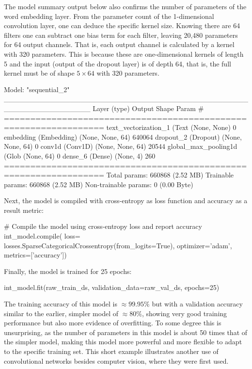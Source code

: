 The model summary output below also confirms the number of parameters of the word embedding layer. From the parameter count of the 1-dimensional convolution layer, one can deduce the specific kernel size. Knowing there are 64 filters one can subtract one bias term for each filter, leaving 20,480 parameters for 64 output channels. That is, each output channel is calculated by a kernel with 320 parameters. This is because these are one-dimensional kernels of length 5 and the input (output of the dropout layer) is of depth 64, that is, the full kernel must be of shape $5 \times 64$ with 320 parameters. 

\begin{textcode}
Model: "sequential_2"
_________________________________________________________________
 Layer (type)                Output Shape              Param #   
=================================================================
 text_vectorization_1 (Text  (None, None)              0         
 embedding (Embedding)       (None, None, 64)          640064    
 dropout_2 (Dropout)         (None, None, 64)          0         
 conv1d (Conv1D)             (None, None, 64)          20544     
 global_max_pooling1d (Glob  (None, 64)                0         
 dense_6 (Dense)             (None, 4)                 260       
=================================================================
Total params: 660868 (2.52 MB)
Trainable params: 660868 (2.52 MB)
Non-trainable params: 0 (0.00 Byte)
\end{textcode}

Next, the model is compiled with cross-entropy as loss function and accuracy as a result metric:

\begin{pythoncode}
# Compile the model using cross-entropy loss and report accuracy
int_model.compile(
    loss= losses.SparseCategoricalCrossentropy(from_logits=True),
    optimizer='adam',
    metrics=['accuracy'])
\end{pythoncode}

Finally, the model is trained for 25 epochs: 

\begin{pythoncode}
int_model.fit(raw_train_ds, 
              validation_data=raw_val_ds, 
              epochs=25)
\end{pythoncode}

The training accuracy of this model is $\approx 99.95\%$ but with a validation accuracy similar to the earlier, simpler model of $\approx 80\%$, showing very good training performance but also more evidence of overfitting. To some degree this is unsurprising, as the number of parameters in this model is about 50 times that of the simpler model, making this model more powerful and more flexible to adapt to the specific training set. This short example illustrates another use of convolutional networks besides computer vision, where they were first used.

